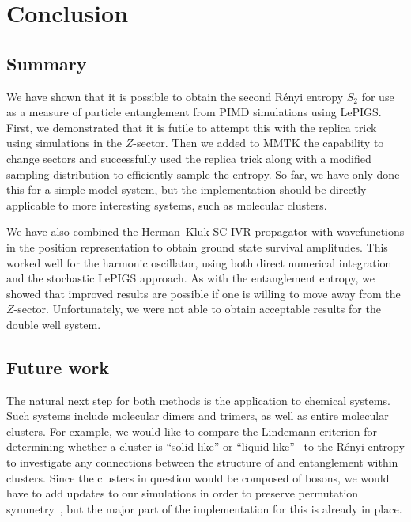 \chapter{Conclusion}

\label{chap:conclusion}


\section{Summary}

We have shown that it is possible to obtain the second Rényi entropy $S_2$ for use as a measure of particle entanglement from PIMD simulations using LePIGS.
First, we demonstrated that it is futile to attempt this with the replica trick using simulations in the $Z$-sector.
Then we added to MMTK the capability to change sectors and successfully used the replica trick along with a modified sampling distribution to efficiently sample the entropy.
So far, we have only done this for a simple model system, but the implementation should be directly applicable to more interesting systems, such as molecular clusters.

We have also combined the Herman--Kluk SC-IVR propagator with wavefunctions in the position representation to obtain ground state survival amplitudes.
This worked well for the harmonic oscillator, using both direct numerical integration and the stochastic LePIGS approach.
As with the entanglement entropy, we showed that improved results are possible if one is willing to move away from the $Z$-sector.
Unfortunately, we were not able to obtain acceptable results for the double well system.


\section{Future work}

The natural next step for both methods is the application to chemical systems.
Such systems include molecular dimers and trimers, as well as entire molecular clusters.
For example, we would like to compare the Lindemann criterion for determining whether a cluster is ``solid-like'' or ``liquid-like''~\cite{schmidt2014inclusion} to the Rényi entropy to investigate any connections between the structure of and entanglement within clusters.
Since the clusters in question would be composed of bosons, we would have to add updates to our simulations in order to preserve permutation symmetry~\cite{herdman2014path}, but the major part of the implementation for this is already in place.


